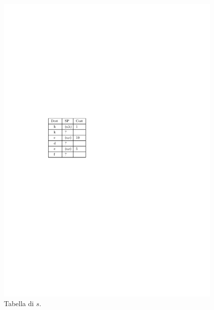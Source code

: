 \documentclass[10pt,xcolor=dvipsnames]{beamer}
\begin{document}
\begin{frame}
\begin{figure}[h]
		\includegraphics[scale=0.7]{routing_table_local_initial_s.pdf}
		\caption*{Tabella di $s$.}
	\end{figure}
\end{frame}
\end{document}

